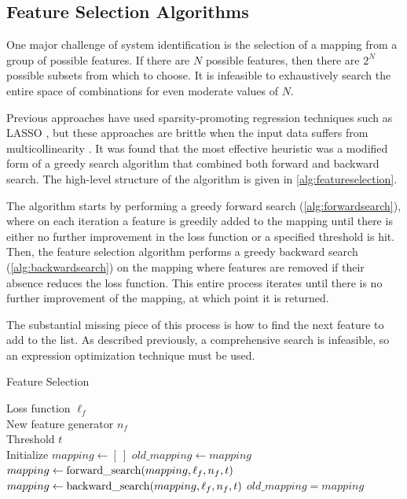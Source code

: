 \documentclass{article}
\begin{document}
\subsection{Feature Selection Algorithms}

One major challenge of system identification is the selection of a mapping from a group of possible features. If there are $N$ possible features, then there are $2^N$ possible subsets from which to choose. It is infeasible to exhaustively search the entire space of combinations for even moderate values of $N$.

Previous approaches have used sparsity-promoting regression techniques such as LASSO \cite{tibshirani1996regression}, but these approaches are brittle when the input data suffers from multicollinearity \cite{rudy2017data}. It was found that the most effective heuristic was a modified form of a greedy search algorithm that combined both forward and backward search. The high-level structure of the algorithm is given in \cref{alg:featureselection}.

The algorithm starts by performing a greedy forward search (\cref{alg:forwardsearch}), where on each iteration a feature is greedily added to the mapping until there is either no further improvement in the loss function or a specified threshold is hit. Then, the feature selection algorithm performs a greedy backward search (\cref{alg:backwardsearch}) on the mapping where features are removed if their absence reduces the loss function. This entire process iterates until there is no further improvement of the mapping, at which point it is returned.

The substantial missing piece of this process is how to find the next feature to add to the list. As described previously, a comprehensive search is infeasible, so an expression optimization technique must be used.


\begin{algorithm}[tb]
   \caption{Feature Selection}
   \label{alg:featureselection}
\begin{algorithmic}
    Loss function $\ell_f$ \\
   \quad \quad \quad New feature generator $n_f$ \\
   \quad \quad \quad Threshold $t$ \\
   \STATE Initialize $mapping \gets [ \ ]$
   \REPEAT
   \STATE $old\_mapping \gets mapping$
   \STATE $mapping \gets {\rm forward\_search}(mapping, \ell_f, n_f, t)$
   \STATE $mapping \gets {\rm backward\_search}(mapping, \ell_f, n_f, t)$
   \UNTIL $old\_mapping = mapping$
\end{algorithmic}
\end{algorithm}
\end{document}
